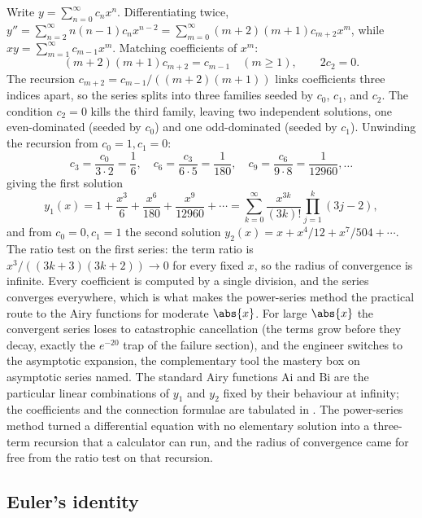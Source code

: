 Write $y = \sum_{n=0}^{\infty} c_{n} x^{n}$. Differentiating twice,
$y'' = \sum_{n=2}^{\infty} n(n-1) c_{n} x^{n-2} = \sum_{m=0}^{\infty}
(m+2)(m+1) c_{m+2} x^{m}$, while $x y = \sum_{m=1}^{\infty} c_{m-1}
x^{m}$. Matching coefficients of $x^{m}$:
\[
(m+2)(m+1) c_{m+2} = c_{m-1} \quad (m \geq 1), \qquad
2 c_{2} = 0.
\]
The recursion $c_{m+2} = c_{m-1}/((m+2)(m+1))$ links coefficients three
indices apart, so the series splits into three families seeded by
$c_{0}$, $c_{1}$, and $c_{2}$. The condition $c_{2} = 0$ kills the
third family, leaving two independent solutions, one even-dominated
(seeded by $c_{0}$) and one odd-dominated (seeded by $c_{1}$). Unwinding
the recursion from $c_{0} = 1, c_{1} = 0$:
\[
c_{3} = \frac{c_{0}}{3 \cdot 2} = \frac{1}{6}, \quad c_{6} =
\frac{c_{3}}{6 \cdot 5} = \frac{1}{180}, \quad c_{9} = \frac{c_{6}}
{9 \cdot 8} = \frac{1}{12960}, \ldots
\]
giving the first solution
\[
y_{1}(x) = 1 + \frac{x^{3}}{6} + \frac{x^{6}}{180} + \frac{x^{9}}
{12960} + \cdots = \sum_{k=0}^{\infty} \frac{x^{3k}}{(3k)!}
\prod_{j=1}^{k} (3j - 2),
\]
and from $c_{0} = 0, c_{1} = 1$ the second solution $y_{2}(x) = x +
x^{4}/12 + x^{7}/504 + \cdots$. The ratio test on the first series:
the term ratio is $x^{3}/((3k+3)(3k+2)) \to 0$ for every fixed $x$, so
the radius of convergence is infinite. Every coefficient is computed by
a single division, and the series converges everywhere, which is what
makes the power-series method the practical route to the Airy functions
for moderate $\abs{x}$. For large $\abs{x}$ the convergent series loses
to catastrophic cancellation (the terms grow before they decay, exactly
the $e^{-20}$ trap of the failure section), and the engineer switches to
the asymptotic expansion, the complementary tool the mastery box on
asymptotic series named. The standard Airy functions $\mathrm{Ai}$ and
$\mathrm{Bi}$ are the particular linear combinations of $y_{1}$ and
$y_{2}$ fixed by their behaviour at infinity; the coefficients and the
connection formulae are tabulated in
\cite{text:v2ch04-abramowitz-stegun-1972}. The power-series method
turned a differential equation with no elementary solution into a
three-term recursion that a calculator can run, and the radius of
convergence came for free from the ratio test on that recursion.

\subsection{Euler's identity}

